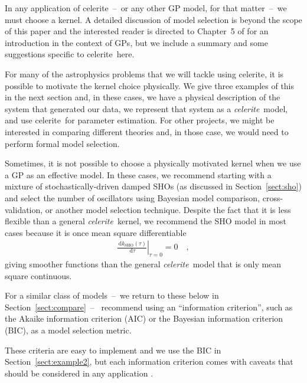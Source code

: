 \documentclass[manuscript, letterpaper]{aastex6}
\makeatletter
\let\origsubsection\subsection
\renewcommand\subsection{\@ifstar{\starsubsection}{\nostarsubsection}}
\newcommand\nostarsubsection[1]{\subsectionprelude\origsubsection{#1}}
\newcommand\starsubsection[1]{\subsectionprelude\origsubsection*{#1}}
\newcommand\subsectionprelude{\vspace{1em}}
\newcommand{\project}[1]{\textsf{#1}}
\newcommand{\celerite}{\project{celerite}}
\newcommand{\celeriteterm}{\emph{celerite}}
\newcommand{\sectionname}{Section}
\newcommand{\sectref}[1]{\ref{sect:#1}}
\newcommand{\Sect}[1]{\sectionname~\sectref{#1}}
\newcommand{\sect}[1]{\Sect{#1}}
\newcommand{\dd}{\ensuremath{\,\mathrm{d}}}
\newcommand{\responseb}[1]{{#1}}
\makeatother
\begin{document}
{\newpage
\subsection{How to choose a celerite model}

In any application of \celerite~--~or any other GP model, for that
matter~--~we must choose a kernel.
A detailed discussion of model selection is beyond the scope of this paper and
the interested reader is directed to Chapter~5 of \citet{Rasmussen:2006} for
an introduction in the context of GPs, but we include a summary and some
suggestions specific to \celerite\ here.

For many of the astrophysics problems that we will tackle using \celerite, it
is possible to motivate the kernel choice physically.
We give three examples of this in the next section and, in these cases, we
have a physical description of the system that generated our data, we
represent that system as a \celeriteterm\ model, and use \celerite\ for
parameter estimation.
For other projects, we might be interested in comparing different theories
and, in those case, we would need to perform formal model selection.

Sometimes, it is not possible to choose a physically motivated kernel when we
use a GP as an effective model.
In these cases, we recommend starting with a mixture of stochastically-driven
damped SHOs (as discussed in \sect{sho}) and select the number of oscillators
using Bayesian model comparison, cross-validation, or another model selection
technique.
Despite the fact that it is less flexible than a general \celeriteterm\
kernel, we recommend the SHO model in most cases because it is once mean
square differentiable
\begin{eqnarray}
    \left.\frac{\dd k_\mathrm{SHO}(\tau)}{\dd \tau}\right|_{\tau=0} = 0 \quad,
\end{eqnarray}
giving smoother functions than the general \celeriteterm\ model that is only
mean square continuous.

For a similar class of models~--~we return to these below in
\sect{compare}~--~\citet{Kelly:2014} recommend using an ``information
criterion'', such as the Akaike information criterion (AIC) or the Bayesian
information criterion (BIC), as a model selection metric.}
\responseb{These criteria are easy to implement and we use the BIC in
    \sect{example2}, but each information criterion comes with caveats that should
    be considered in any application \citep[see, for example,][]{Ivezic:2014}.}
\end{document}
